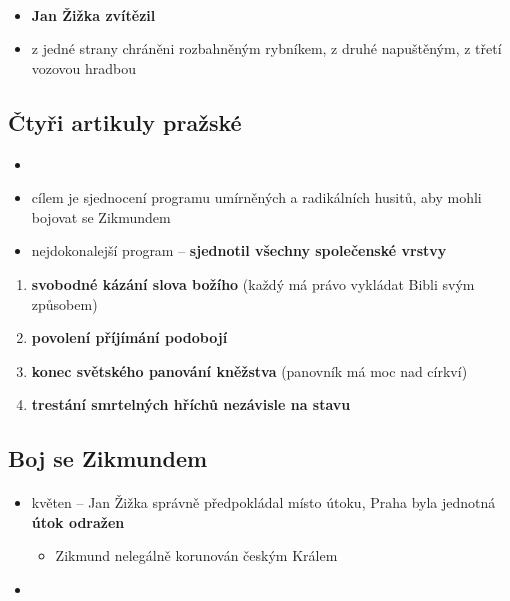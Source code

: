 \paragraph{}
\begin{itemize}
\item \textbf{Jan Žižka zvítězil}
\item z jedné strany chráněni rozbahněným rybníkem, z druhé napuštěným, z třetí vozovou hradbou
\end{itemize}

\subsection{Čtyři artikuly pražské}
\begin{itemize}
\item {}
\item cílem je sjednocení programu umírněných a radikálních husitů, aby mohli bojovat se Zikmundem
\item nejdokonalejší program -- \textbf{sjednotil všechny společenské vrstvy}
\end{itemize}
\begin{enumerate}
\item \textbf{svobodné kázání slova božího} (každý má právo vykládat Bibli svým způsobem)
\item \textbf{povolení příjímání podobojí}
\item \textbf{konec světského panování kněžstva} (panovník má moc nad církví)
\item \textbf{trestání smrtelných hříchů nezávisle na stavu}
\end{enumerate}

\subsection{Boj se Zikmundem}
\paragraph{}
\begin{itemize}
\item květen -- Jan Žižka správně předpokládal místo útoku, Praha byla jednotná \ra\textbf{ útok odražen}
\begin{itemize}
\item Zikmund nelegálně korunován českým Králem
\end{itemize}
\item {}
\end{itemize}

